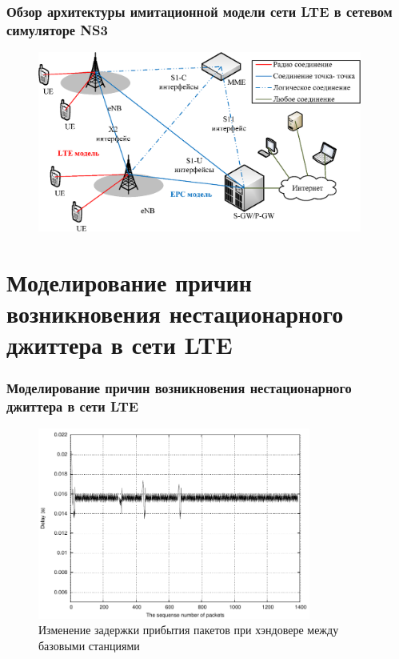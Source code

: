 \documentclass[10pt,pdf,hyperref={unicode}]{beamer}
\begin{document}
\begin{frame}
\frametitle{Обзор архитектуры имитационной модели сети LTE в сетевом симуляторе NS3}
\begin{figure} [h]
  \center
\includegraphics [width=0.95\textwidth] {LTEEPC.eps}
\end{figure}



\end{frame}



\section{Моделирование причин возникновения нестационарного джиттера в сети LTE}
\begin{frame}
\frametitle{Моделирование причин возникновения нестационарного джиттера в сети LTE}
\begin{figure} [h]
  \center
\includegraphics [width=0.80\textwidth] {hand-eps-converted-to.pdf}
\caption*{Изменение задержки прибытия пакетов при хэндовере между базовыми станциями}
\end{figure}
\end{frame}
\end{document}
